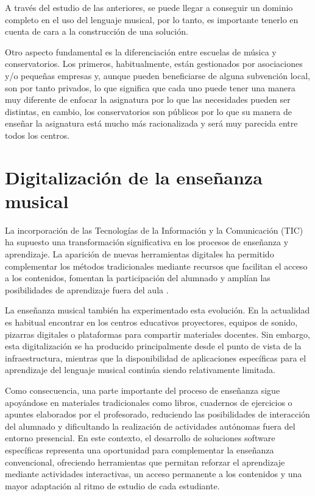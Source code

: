 A través del estudio de las anteriores, se puede llegar a conseguir un dominio completo en el uso del lenguaje musical, por lo tanto, es importante tenerlo en cuenta de cara a la construcción de una solución.

Otro aspecto fundamental es la diferenciación entre escuelas de música y conservatorios. Los primeros, habitualmente, están gestionados por asociaciones y/o pequeñas empresas y, aunque pueden beneficiarse de alguna subvención local, son por tanto privados, lo que significa que cada uno puede tener una manera muy diferente de enfocar la asignatura por lo que las necesidades pueden ser distintas, en cambio, los conservatorios son públicos por lo que su manera de enseñar la asignatura está mucho más racionalizada y será muy parecida entre todos los centros.

\section{Digitalización de la enseñanza musical}

La incorporación de las Tecnologías de la Información y la Comunicación (TIC) ha supuesto una transformación significativa en los procesos de enseñanza y aprendizaje. La aparición de nuevas herramientas digitales ha permitido complementar los métodos tradicionales mediante recursos que facilitan el acceso a los contenidos, fomentan la participación del alumnado y amplían las posibilidades de aprendizaje fuera del aula \cite{INTEF_LaboratorioMusica}.

La enseñanza musical también ha experimentado esta evolución. En la actualidad es habitual encontrar en los centros educativos proyectores, equipos de sonido, pizarras digitales o plataformas para compartir materiales docentes. Sin embargo, esta digitalización se ha producido principalmente desde el punto de vista de la infraestructura, mientras que la disponibilidad de aplicaciones específicas para el aprendizaje del lenguaje musical continúa siendo relativamente limitada.

Como consecuencia, una parte importante del proceso de enseñanza sigue apoyándose en materiales tradicionales como libros, cuadernos de ejercicios o apuntes elaborados por el profesorado, reduciendo las posibilidades de interacción del alumnado y dificultando la realización de actividades autónomas fuera del entorno presencial.
\newpage
En este contexto, el desarrollo de soluciones software específicas representa una oportunidad para complementar la enseñanza convencional, ofreciendo herramientas que permitan reforzar el aprendizaje mediante actividades interactivas, un acceso permanente a los contenidos y una mayor adaptación al ritmo de estudio de cada estudiante.


